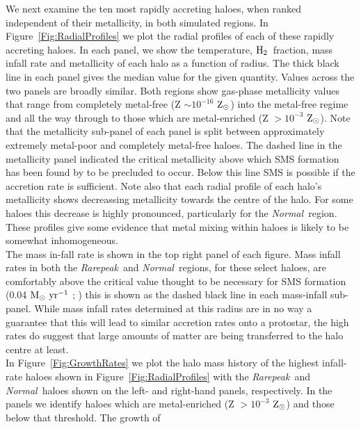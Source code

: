 \documentclass[graphics, twocolumn, usenatbib]{mn2e}
\newcommand{\msolaryr} {$\rm{M_{\odot}~yr^{-1}}~$}
\newcommand{\zsolarc} {$\rm{Z_{\odot}}$}
\newcommand{\molH} {$\rm{H_2}$~}
\newcommand{\rarepeak} {\textit{Rarepeak~}}
\newcommand{\normal} {\textit{Normal~}}
\begin{document}
\indent We next examine the ten most rapidly accreting haloes, when ranked independent of their metallicity, in both simulated regions.
In Figure~\ref{Fig:RadialProfiles} we plot the radial profiles of each of these rapidly
accreting haloes.
In each panel, we show the temperature, \molH fraction, mass infall rate and
metallicity of each halo as a function of radius. 
The thick black line in each panel gives the
median value for the given quantity. Values across the two panels are broadly similar. Both regions
show gas-phase metallicity values that range from completely metal-free (Z $\sim 10^{-16}$ \zsolarc)
into the metal-free regime and all the way through to those which are metal-enriched (Z $> 10^{-3}$
\zsolarc). Note that the metallicity sub-panel of each panel
is split between approximately extremely metal-poor and completely metal-free haloes. The dashed
line in the metallicity panel indicated the critical metallicity above which SMS formation
has been found by \cite{Chon_2020} to be precluded to occur. Below this line SMS is possible if the
accretion rate is sufficient. Note also that each radial profile of each halo's  metallicity shows
decreassing metallicity towards the centre of the halo. For some haloes this decrease is highly
pronounced, particularly for the \normal region. These profiles give some evidence that metal
mixing within haloes is likely to be somewhat inhomogeneous. \\
\indent The mass in-fall rate is shown in the top right panel of each figure. 
Mass infall rates in both the \rarepeak and \normal regions, for these select haloes, are
comfortably above the critical value thought to be necessary for SMS formation (0.04
\msolaryr; \citealt{Sakurai_2016}) this is shown as the dashed black line in each mass-infall sub-panel.
While mass infall rates determined at this radius are in no
way a guarantee that this will lead to similar accretion rates onto a protostar, the high rates do
suggest that large amounts of matter are being transferred to the halo centre at least. \\
\indent In Figure~\ref{Fig:GrowthRates} we plot the halo mass history of the highest infall-rate haloes shown in Figure~\ref{Fig:RadialProfiles} with the \rarepeak and \normal haloes
shown on the left- and right-hand panels, respectively. In the panels we identify haloes which
are metal-enriched (Z $> 10^{-3}$ \zsolarc) and those below that threshold. The growth of
\end{document}
